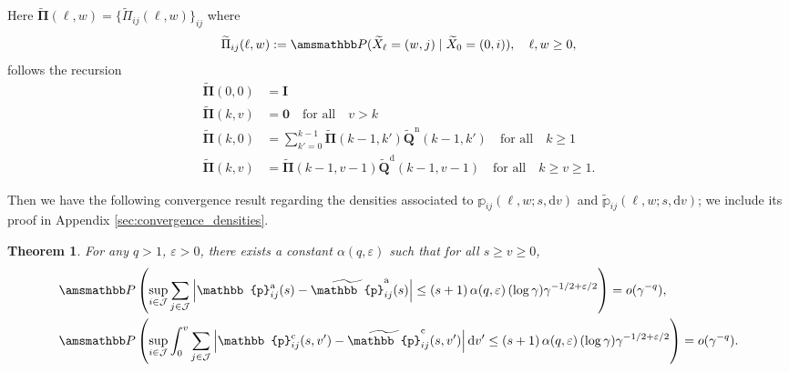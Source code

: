 \documentclass[11pt,leqno]{amsart}
\numberwithin{table}{section}
\numberwithin{figure}{section}
\numberwithin{equation}{section}
\newcommand{\dd}{\mathrm{d}}
\newcommand{\1}{{\mathds{1}}}
\newcommand{\0}{\mat{0}}
\renewcommand{\P }{{\amsmathbb P}}
\newtheorem{theorem}[lemma]{Theorem}
\newcommand{\ap}[1]{\mathbb{#1}}
\newcommand{\tld}[1]{\widetilde{#1}}
\newcommand{\apt}[1]{\tld{\mathbb{#1}}}
\begin{document}
Here $\tld{\bm{\Pi}}(\ell,w)=\{\tld{\Pi}_{ij}(\ell,w)\}_{ij}$ where
\begin{align*}\tld{\Pi}_{ij}(\ell,w):=\P(\tld{X}_{\ell}=(w,j)\mid \tld{X}_{0}=(0,i)),\quad \ell,w\ge 0,\end{align*}
follows the recursion
\begin{align}
\tld{\bm{\Pi}}(0,0)&=\bm{I}\label{eq:rec_aux_1t}\\
\tld{\bm{\Pi}}(k,v)&=\bm{0}\quad\mbox{for all}\quad v>k\label{eq:rec_aux_2t}\\
\tld{\bm{\Pi}}(k,0)& = \sum_{k'=0}^{k-1}  \tld{\bm{\Pi}}(k-1,k')\tld{\bm{Q}}^{\mathrm{n}}(k-1,k')\quad\mbox{for all}\quad k\ge 1\label{eq:rec_aux_3t}\\
\tld{\bm{\Pi}}(k,v)& = \tld{\bm{\Pi}}(k-1,v-1)\tld{\bm{Q}}^{\mathrm{d}}(k-1,v-1)\quad\mbox{for all}\quad k\ge v\ge 1.\label{eq:rec_aux_4t}
\end{align}

Then we have the following convergence result regarding the densities associated to $\ap{p}_{ij}(\ell, w; s, \dd v)$ and $\apt{p}_{ij}(\ell, w; s, \dd v)$; we include its proof in Appendix \ref{sec:convergence_densities}.

\begin{theorem}\label{th:convergence_densities}
For any $q>1$, $\varepsilon > 0$, there exists a constant $\alpha(q,\varepsilon)$ such that { for all $s\ge v\ge 0$},
\begin{align*}
&\P\left({ \sup_{i\in\mathcal{J}}\sum_{j\in\mathcal{J}}}\left|\ap{p}_{ij}^{\mathrm{a}}(s) - \apt{p}_{ij}^{\mathrm{a}}( s)\right|\le (s+1)\,\alpha(q,\varepsilon)\,(\log \gamma)\gamma^{-1/2 + \varepsilon/2}\right)=o(\gamma^{-q}),\\
&\P\left({ \sup_{i\in\mathcal{J}} \int_0^v \sum_{j\in\mathcal{J}}\left| \ap{p}_{ij}^{\mathrm{c}}(s,v') - \apt{p}_{ij}^{\mathrm{c}}(s,v')\right| \dd v'}\le (s+1)\,\alpha(q,\varepsilon)\,(\log \gamma)\gamma^{-1/2 + \varepsilon/2}\right)=o(\gamma^{-q}).
\end{align*}
\end{theorem}
\end{document}
